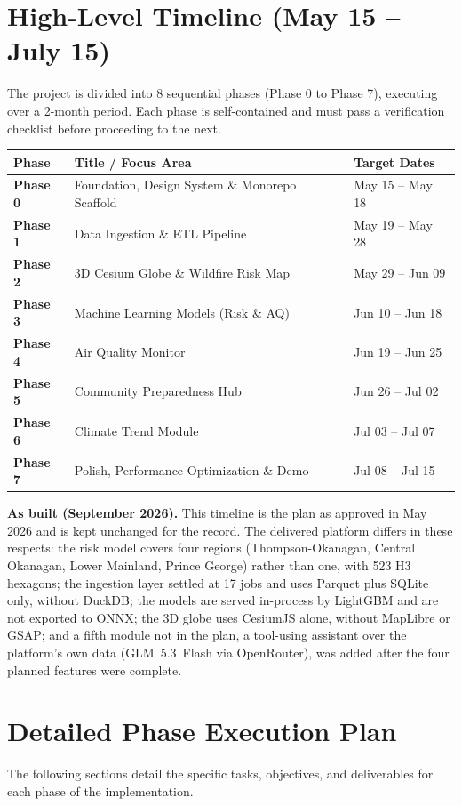 \documentclass[12pt,letterpaper]{article}
\begin{document}
\section{High-Level Timeline (May 15 -- July 15)}
The project is divided into 8 sequential phases (Phase 0 to Phase 7), executing over a 2-month period. Each phase is self-contained and must pass a verification checklist before proceeding to the next.

\vspace{0.5cm}
\noindent
\begin{tabularx}{\textwidth}{@{} >{\bfseries}l X l @{}}
\toprule
\textbf{Phase} & \textbf{Title / Focus Area} & \textbf{Target Dates} \\
\midrule
Phase 0 & Foundation, Design System \& Monorepo Scaffold & May 15 -- May 18 \\
Phase 1 & Data Ingestion \& ETL Pipeline & May 19 -- May 28 \\
Phase 2 & 3D Cesium Globe \& Wildfire Risk Map & May 29 -- Jun 09 \\
Phase 3 & Machine Learning Models (Risk \& AQ) & Jun 10 -- Jun 18 \\
Phase 4 & Air Quality Monitor & Jun 19 -- Jun 25 \\
Phase 5 & Community Preparedness Hub & Jun 26 -- Jul 02 \\
Phase 6 & Climate Trend Module & Jul 03 -- Jul 07 \\
Phase 7 & Polish, Performance Optimization \& Demo & Jul 08 -- Jul 15 \\
\bottomrule
\end{tabularx}
\vspace{0.5cm}
\vspace{0.3cm}
\noindent\textbf{As built (September 2026).} This timeline is the plan as approved
in May 2026 and is kept unchanged for the record. The delivered platform differs
in these respects: the risk model covers four regions (Thompson-Okanagan, Central
Okanagan, Lower Mainland, Prince George) rather than one, with 523 H3 hexagons;
the ingestion layer settled at 17 jobs and uses Parquet plus SQLite only, without
DuckDB; the models are served in-process by LightGBM and are not exported to ONNX;
the 3D globe uses CesiumJS alone, without MapLibre or GSAP; and a fifth module not
in the plan, a tool-using assistant over the platform's own data (GLM~5.3~Flash via
OpenRouter), was added after the four planned features were complete.
\vspace{0.3cm}

\newpage
\section{Detailed Phase Execution Plan}
The following sections detail the specific tasks, objectives, and deliverables for each phase of the implementation.
\end{document}
